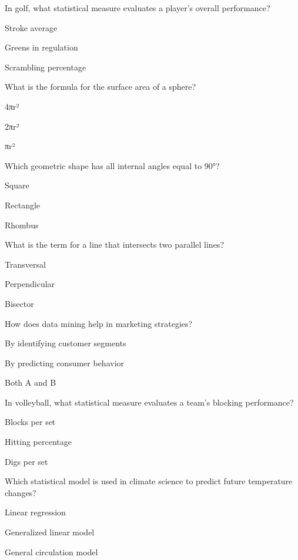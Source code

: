 \begin{enhancedmcq}{In golf, what statistical measure evaluates a player's overall performance?}
\item Stroke average
\item Greens in regulation
\item Scrambling percentage

\end{enhancedmcq}
\begin{enhancedmcq}{What is the formula for the surface area of a sphere?}
\item 4πr²
\item 2πr²
\item πr²

\end{enhancedmcq}
\begin{enhancedmcq}{Which geometric shape has all internal angles equal to 90°?}
\item Square
\item Rectangle
\item Rhombus

\end{enhancedmcq}
\begin{enhancedmcq}{What is the term for a line that intersects two parallel lines?}
\item Transversal
\item Perpendicular
\item Bisector

\end{enhancedmcq}
\begin{enhancedmcq}{How does data mining help in marketing strategies?}
\item By identifying customer segments
\item By predicting consumer behavior
\item Both A and B

\end{enhancedmcq}
\begin{enhancedmcq}{In volleyball, what statistical measure evaluates a team's blocking performance?}
\item Blocks per set
\item Hitting percentage
\item Digs per set

\end{enhancedmcq}
\begin{enhancedmcq}{Which statistical model is used in climate science to predict future temperature changes?}
\item Linear regression
\item Generalized linear model
\item General circulation model

\end{enhancedmcq}

